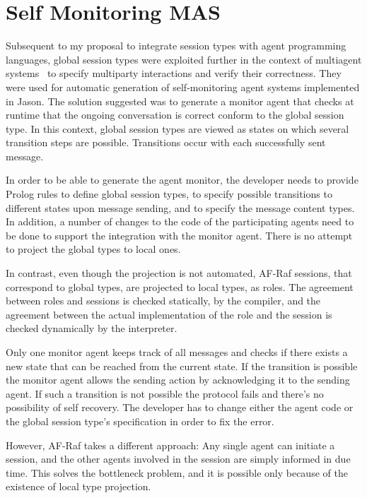 \documentclass[a4paper,12pt,oneside,fleqn]{book} %
\begin{document}
\section{Self Monitoring MAS} %
Subsequent to my proposal to integrate session types with agent programming
languages, global session types were exploited further in the context of
multiagent systems~\cite{DBLP:conf/dalt/AnconaDM12} to specify multiparty
interactions and verify their correctness. They were used for automatic
generation of self-monitoring agent systems implemented in Jason. The
solution suggested was to generate a monitor agent that checks at runtime
that the ongoing conversation is correct conform to the global session
type. In this context, global session types are viewed as states on which
several transition steps are possible. Transitions occur with each
successfully sent message.

In order to be able to generate the agent monitor, the developer needs to
provide Prolog rules to define global session types, to specify possible
transitions to different states upon message sending, and to specify the
message content types. In addition, a number of changes to the code of the
participating agents need to be done to support the integration with the
monitor agent. There is no attempt to project the global types to local
ones. 

In contrast, even though the projection is not automated, AF-Raf
sessions, that correspond to global types, are projected to local types, as
roles. The agreement between roles and sessions is checked statically, by
the compiler, and the agreement between the actual implementation of the
role and the session is checked dynamically by the interpreter.

Only one monitor agent keeps track of all messages and checks if there
exists a new state that can be reached from the current state. If the
transition is possible the monitor agent allows the sending action by
acknowledging it to the sending agent. If such a transition is not possible
the protocol fails and there's no possibility of self recovery.  The
developer has to change either the agent code or the global session type's
specification in order to fix the error.

However, AF-Raf takes a different approach: Any single agent can initiate a
session, and the other agents involved in the session are simply informed
in due time. This solves the bottleneck problem, and it is possible only
because of the existence of local type projection.
\end{document}
